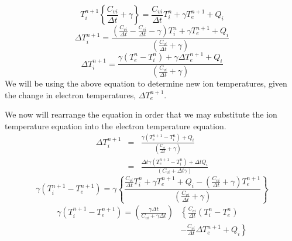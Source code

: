 \documentclass{article}
\newcommand{\dt}{\ensuremath{\Delta t}}
\newcommand{\cviOdt}{\ensuremath{\frac{C_{vi}}{\dt}}}
\begin{document}
\begin{equation}
        T_{i}^{n+1}\left\{ \cviOdt + \gamma \right\} =
                \cviOdt T_{i}^{n} + \gamma T_{e}^{n+1} + Q_{i}
\end{equation}
\begin{equation}
        \Delta T_{i}^{n+1} = \frac{ \left( \cviOdt - \cviOdt - \gamma 
                                        \right) T_{i}^{n}
                         + \gamma T_{e}^{n+1} + Q_{i} }
                {(\cviOdt + \gamma)}
\end{equation}
\begin{equation}
   \boxed{
        \Delta T_{i}^{n+1} = \frac{ \gamma ( T_{e}^{n} - T_{i}^{n} )
                                + \gamma \Delta T_{e}^{n+1} + Q_{i} }
                {(\cviOdt + \gamma)}
         }
\label{eq:Tinp1}
\end{equation}
We will be using the above equation to determine new ion temperatures,
given the change in electron temperatures, $\Delta T_{e}^{n+1}$.

We now will rearrange the equation in order that we may substitute the
ion temperature equation into the electron temperature equation.
\begin{eqnarray}
        \Delta T_{i}^{n+1} &=& \frac{ \gamma ( T_{e}^{n+1} - T_{i}^{n} )
                                + Q_{i} }{(\cviOdt + \gamma)} 
                \\
                           &=& \frac{ \dt \gamma
                                         ( T_{e}^{n+1} - T_{i}^{n} )
                                + \dt Q_{i} }{(C_{vi} + \dt \gamma)}
\end{eqnarray}
\begin{equation}
        \gamma (T_{i}^{n+1}-T_{e}^{n+1}) =
                \gamma \left\{ \frac{\cviOdt T_{i}^{n} + \gamma T_{e}^{n+1}
                                + Q_{i} - (\cviOdt + \gamma) T_{e}^{n+1}}
                                {(\cviOdt + \gamma)} \right\}
\end{equation}
\begin{equation}
   \boxed{
   \begin{split}
        \gamma (T_{i}^{n+1}-T_{e}^{n+1}) =
                \left(\frac{\gamma\dt}{C_{vi} + \gamma \dt} \right)
                &  \left\{\cviOdt(T_{i}^{n} - T_{e}^{n}) \right.
        \\
                & \left.
                        - \cviOdt \Delta T_{e}^{n+1}
                        + Q_{i} \right\}
   \end{split}
   }
\label{eq:Ti}
\end{equation}
\end{document}
